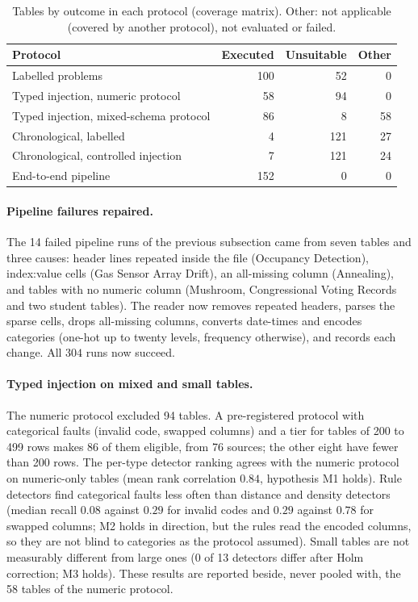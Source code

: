\documentclass[conference]{IEEEtran}
\begin{document}
\begin{table}[t]
\caption{Tables by outcome in each protocol (coverage matrix). Other: not applicable (covered by another protocol), not evaluated or failed.}
\label{tab:coverage}
\centering
\footnotesize
\begin{tabular}{lrrr}
\toprule
Protocol & Executed & Unsuitable & Other \\
\midrule
Labelled problems & 100 & 52 & 0 \\
Typed injection, numeric protocol & 58 & 94 & 0 \\
Typed injection, mixed-schema protocol & 86 & 8 & 58 \\
Chronological, labelled & 4 & 121 & 27 \\
Chronological, controlled injection & 7 & 121 & 24 \\
End-to-end pipeline & 152 & 0 & 0 \\
\bottomrule
\end{tabular}
\end{table}

\paragraph{Pipeline failures repaired.} The 14 failed pipeline runs of the previous subsection came from seven tables and three causes: header lines repeated inside the file (Occupancy Detection), index:value cells (Gas Sensor Array Drift), an all-missing column (Annealing), and tables with no numeric column (Mushroom, Congressional Voting Records and two student tables). The reader now removes repeated headers, parses the sparse cells, drops all-missing columns, converts date-times and encodes categories (one-hot up to twenty levels, frequency otherwise), and records each change. All $304$ runs now succeed.

\paragraph{Typed injection on mixed and small tables.} The numeric protocol excluded 94 tables. A pre-registered protocol with categorical faults (invalid code, swapped columns) and a tier for tables of 200 to 499 rows makes 86 of them eligible, from 76 sources; the other eight have fewer than 200 rows. The per-type detector ranking agrees with the numeric protocol on numeric-only tables (mean rank correlation $0.84$, hypothesis M1 holds). Rule detectors find categorical faults less often than distance and density detectors (median recall $0.08$ against $0.29$ for invalid codes and $0.29$ against $0.78$ for swapped columns; M2 holds in direction, but the rules read the encoded columns, so they are not blind to categories as the protocol assumed). Small tables are not measurably different from large ones (0 of 13 detectors differ after Holm correction; M3 holds). These results are reported beside, never pooled with, the 58 tables of the numeric protocol.
\end{document}
